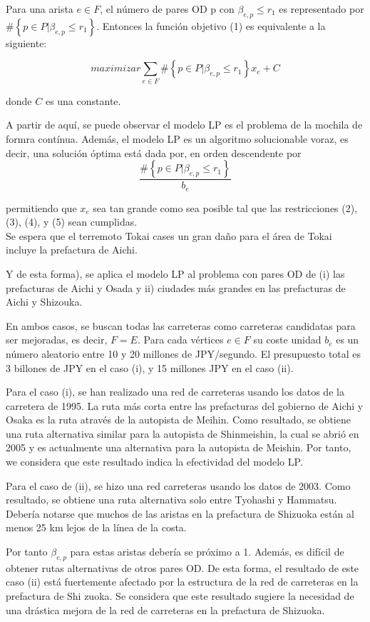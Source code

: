 \documentclass[10pt]{report}
\begin{document}
Para una arista $e \in F$, el número de pares OD p con $\beta_{e,p} \leq r_{1}$ es representado por $\#\left\{ p \in P | \beta_{e,p} \leq r_{1} \right \}$. 
Entonces la función objetivo  (1) es equivalente a la siguiente:

$$
maximizar \sum_{e \in F} \#\left\{ p \in P | \beta_{e,p} \leq r_{1} \right\} x_{e} + C
$$

donde $C$ es una constante.

A partir de aquí, se puede observar el modelo LP es el problema de la mochila de formra contínua. Además, el modelo LP es un algoritmo solucionable voraz, es decir, una solución óptima está dada por, en orden descendente  por
$$
\frac{\#\left\{ p \in P | \beta_{e,p} \leq r_{1} \right\}}{b_{e}}
$$

permitiendo que $x_{e}$ sea tan grande como sea posible tal que las restricciones (2), (3), (4), y (5) sean cumplidas.\\

Se espera que el terremoto Tokai cases un gran daño para el área de Tokai incluye la prefactura de Aichi.

Y de esta forma), se aplica el modelo LP al problema con pares OD de (i) las prefacturas de Aichi y Osada y ii)  ciudades más grandes en las prefacturas de Aichi y Shizouka.

En ambos casos, se buscan todas las carreteras como carreteras candidatas para ser mejoradas, es decir, $F=E$.
Para cada vértices $e \in F$ su coste unidad $b_{e}$ es un número aleatorio entre 10 y 20 millones de JPY/segundo. El presupuesto total es 3 billones de JPY en el caso (i), y 15 millones  JPY en el caso (ii).

Para el caso (i), se han realizado una red de carreteras usando los datos de la carretera de 1995. La ruta más corta entre las prefacturas  del gobierno de Aichi y Osaka es la ruta através de la autopista de Meihin. Como resultado, se obtiene una ruta alternativa similar para la autopista de Shinmeishin, la cual se abrió en 2005 y es actualmente una alternativa para la autopista de Meishin.
Por tanto, we considera que este resultado indica la efectividad del modelo LP.

Para el caso de (ii), se hizo una red carreteras usando los datos de 2003.  Como resultado, se obtiene una ruta alternativa solo entre Tyohashi y Hammatsu.
Debería notarse que muchos de las aristas en la prefactura de Shizuoka están al menos 25 km lejos de la línea de la costa.

Por tanto $\beta_{e,p}$ para estas aristas debería se próximo a 1.
Además, es difícil de obtener rutas alternativas de otros pares OD. De esta forma, el resultado de este caso (ii)  está fuertemente afectado por la estructura de la red de carreteras en la prefactura de Shi zuoka. Se considera que este resultado sugiere la necesidad de una drástica mejora de la red de carreteras en la prefactura de Shizuoka.
\end{document}
